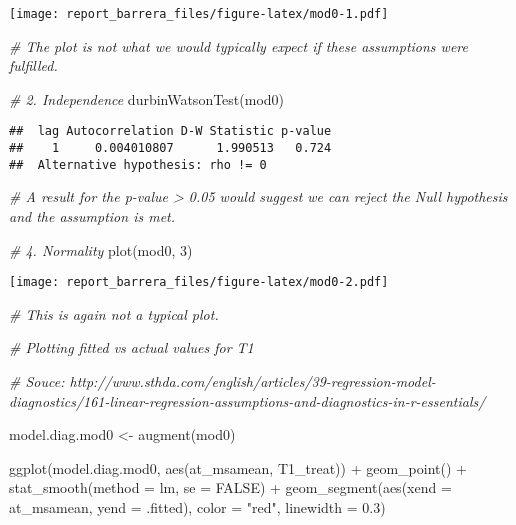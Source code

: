 \documentclass[
]{article}
\newenvironment{Shaded}{\begin{snugshade}}{\end{snugshade}}
\newcommand{\AttributeTok}[1]{\textcolor[rgb]{0.77,0.63,0.00}{#1}}
\newcommand{\CommentTok}[1]{\textcolor[rgb]{0.56,0.35,0.01}{\textit{#1}}}
\newcommand{\ConstantTok}[1]{\textcolor[rgb]{0.00,0.00,0.00}{#1}}
\newcommand{\DecValTok}[1]{\textcolor[rgb]{0.00,0.00,0.81}{#1}}
\newcommand{\FloatTok}[1]{\textcolor[rgb]{0.00,0.00,0.81}{#1}}
\newcommand{\FunctionTok}[1]{\textcolor[rgb]{0.00,0.00,0.00}{#1}}
\newcommand{\NormalTok}[1]{#1}
\newcommand{\OtherTok}[1]{\textcolor[rgb]{0.56,0.35,0.01}{#1}}
\newcommand{\SpecialCharTok}[1]{\textcolor[rgb]{0.00,0.00,0.00}{#1}}
\newcommand{\StringTok}[1]{\textcolor[rgb]{0.31,0.60,0.02}{#1}}
\begin{document}
\texttt{[image: report\_barrera\_files/figure-latex/mod0-1.pdf]}

\begin{Shaded}
\begin{Highlighting}[]
\CommentTok{\# The plot is not what we would typically expect if these assumptions were fulfilled.}

\CommentTok{\# 2. Independence}
\FunctionTok{durbinWatsonTest}\NormalTok{(mod0)}
\end{Highlighting}
\end{Shaded}

\begin{verbatim}
##  lag Autocorrelation D-W Statistic p-value
##    1     0.004010807      1.990513   0.724
##  Alternative hypothesis: rho != 0
\end{verbatim}

\begin{Shaded}
\begin{Highlighting}[]
\CommentTok{\# A result for the p{-}value \textgreater{} 0.05 would suggest we can reject the Null hypothesis and the assumption is met.}

\CommentTok{\# 4. Normality}
\FunctionTok{plot}\NormalTok{(mod0, }\DecValTok{3}\NormalTok{)}
\end{Highlighting}
\end{Shaded}

\texttt{[image: report\_barrera\_files/figure-latex/mod0-2.pdf]}

\begin{Shaded}
\begin{Highlighting}[]
\CommentTok{\# This is again not a typical plot.}


\CommentTok{\# Plotting fitted vs actual values for T1}

\CommentTok{\# Souce: http://www.sthda.com/english/articles/39{-}regression{-}model{-}diagnostics/161{-}linear{-}regression{-}assumptions{-}and{-}diagnostics{-}in{-}r{-}essentials/}

\NormalTok{model.diag.mod0 }\OtherTok{\textless{}{-}} \FunctionTok{augment}\NormalTok{(mod0)}

\FunctionTok{ggplot}\NormalTok{(model.diag.mod0, }\FunctionTok{aes}\NormalTok{(at\_msamean, T1\_treat)) }\SpecialCharTok{+}
  \FunctionTok{geom\_point}\NormalTok{() }\SpecialCharTok{+}
  \FunctionTok{stat\_smooth}\NormalTok{(}\AttributeTok{method =}\NormalTok{ lm, }\AttributeTok{se =} \ConstantTok{FALSE}\NormalTok{) }\SpecialCharTok{+}
  \FunctionTok{geom\_segment}\NormalTok{(}\FunctionTok{aes}\NormalTok{(}\AttributeTok{xend =}\NormalTok{ at\_msamean, }\AttributeTok{yend =}\NormalTok{ .fitted), }\AttributeTok{color =} \StringTok{"red"}\NormalTok{, }\AttributeTok{linewidth =} \FloatTok{0.3}\NormalTok{)}
\end{Highlighting}
\end{Shaded}
\end{document}

